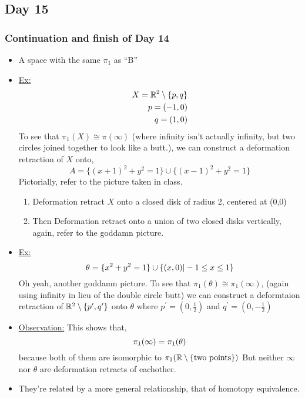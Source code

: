 \subsection{Day 15}
\subsubsection{Continuation and finish of Day 14}
\begin{itemize}
    \item A space with the same $\pi_1$ as ``B''
    \item \underline{Ex:}
        \begin{align*}
            X = \mathbb{R}^2\setminus\{p,q\}\\
            p = (-1,0)\\
            q = (1,0)\\
        \end{align*}
        To see that $\pi_1(X) \cong \pi(\infty)$ (where infinity isn't actually infinity,
        but two circles joined together to look like a butt.), we can construct a 
        deformation retraction of $X$ onto,
        \[
            A=\{(x+1)^2+y^2=1\}\cup \{(x-1)^2+y^2=1\}
        \]
        Pictorially, refer to the picture taken in class.
        \begin{enumerate}
            \item Deformation retract $X$ onto a closed disk of radius 2, centered
                at (0,0)
            \item Then Deformation retract onto a union of two closed disks vertically, 
                again, refer to the goddamn picture.
        \end{enumerate}
    \item
        \underline{Ex:}
        \[
            \theta=\{x^2+y^2=1\}\cup\{(x,0)| -1 \leq x \leq 1\}\\
        \]
        Oh yeah, another goddamn picture. To see that $\pi_1(\theta)\cong\pi_{1}(\infty)$,
        (again using infinity in lieu of the double circle butt)
        we can construct a deformtaion retraction of $\mathbb{R}^2\setminus\{p^{\prime},q^{\prime}\}$
        onto $\theta$ where $p^{\prime}=(0,\frac{1}{2})$ and $q^{\prime}=(0,-\frac{1}{2})$
    \item \underline{Observation:} This shows that,
        \[
            \pi_1(\infty)=\pi_1(\theta)\\
        \]
        because both of them are isomorphic to $\pi_1(\mathbb{R}\setminus\{\text{two points}\})$
        But neither $\infty$ nor $\theta$ are deformation retracts of eachother.
    \item They're related by a more general relationship, that of homotopy equivalence.
\end{itemize}
